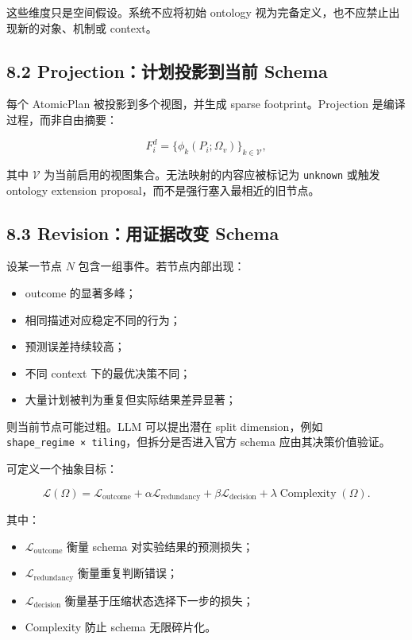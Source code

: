 \documentclass[
  11pt]{ctexart}
\providecommand{\tightlist}{%
  \setlength{\itemsep}{0pt}\setlength{\parskip}{0pt}}
\begin{document}
这些维度只是空间假设。系统不应将初始 ontology
视为完备定义，也不应禁止出现新的对象、机制或 context。

\subsection{8.2 Projection：计划投影到当前
Schema}\label{projectionux8ba1ux5212ux6295ux5f71ux5230ux5f53ux524d-schema}

每个 AtomicPlan 被投影到多个视图，并生成 sparse footprint。Projection
是编译过程，而非自由摘要：

\[
F_i^d=
\{
\phi_k(P_i;\Omega_v)
\}_{k\in\mathcal{V}},
\]

其中 \(\mathcal{V}\) 为当前启用的视图集合。无法映射的内容应被标记为
\texttt{unknown} 或触发 ontology extension
proposal，而不是强行塞入最相近的旧节点。

\subsection{8.3 Revision：用证据改变
Schema}\label{revisionux7528ux8bc1ux636eux6539ux53d8-schema}

设某一节点 \(N\) 包含一组事件。若节点内部出现：

\begin{itemize}
\tightlist
\item
  outcome 的显著多峰；
\item
  相同描述对应稳定不同的行为；
\item
  预测误差持续较高；
\item
  不同 context 下的最优决策不同；
\item
  大量计划被判为重复但实际结果差异显著；
\end{itemize}

则当前节点可能过粗。LLM 可以提出潜在 split dimension，例如
\texttt{shape\_regime\ ×\ tiling}，但拆分是否进入官方 schema
应由其决策价值验证。

可定义一个抽象目标：

\[
\mathcal{L}(\Omega)=
\mathcal{L}_{\text{outcome}}
+\alpha\mathcal{L}_{\text{redundancy}}
+\beta\mathcal{L}_{\text{decision}}
+\lambda\operatorname{Complexity}(\Omega).
\]

其中：

\begin{itemize}
\tightlist
\item
  \(\mathcal{L}_{\text{outcome}}\) 衡量 schema 对实验结果的预测损失；
\item
  \(\mathcal{L}_{\text{redundancy}}\) 衡量重复判断错误；
\item
  \(\mathcal{L}_{\text{decision}}\) 衡量基于压缩状态选择下一步的损失；
\item
  Complexity 防止 schema 无限碎片化。
\end{itemize}
\end{document}
